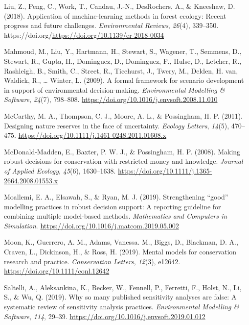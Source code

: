\documentclass[
]{article}
\newlength{\cslhangindent}
\newenvironment{CSLReferences}[2] %
 {\begin{list}{}{%
  \setlength{\itemindent}{0pt}
  \setlength{\leftmargin}{0pt}
  \setlength{\parsep}{0pt}
  \ifodd #1
   \setlength{\leftmargin}{\cslhangindent}
   \setlength{\itemindent}{-1\cslhangindent}
  \fi
  \setlength{\itemsep}{#2\baselineskip}}}
 {\end{list}}
\begin{document}
\begin{CSLReferences}{1}{0}
Liu, Z., Peng, C., Work, T., Candau, J.-N., DesRochers, A., \& Kneeshaw,
D. (2018). Application of machine-learning methods in forest ecology:
Recent progress and future challenges. \emph{Environmental Reviews},
\emph{26}(4), 339--350.
https://doi.org/\url{https://doi.org/10.1139/er-2018-0034}

Mahmoud, M., Liu, Y., Hartmann, H., Stewart, S., Wagener, T., Semmens,
D., Stewart, R., Gupta, H., Dominguez, D., Dominguez, F., Hulse, D.,
Letcher, R., Rashleigh, B., Smith, C., Street, R., Ticehurst, J., Twery,
M., Delden, H. van, Waldick, R., \ldots{} Winter, L. (2009). A formal
framework for scenario development in support of environmental
decision-making. \emph{Environmental Modelling \& Software},
\emph{24}(7), 798--808.
\url{https://doi.org/10.1016/j.envsoft.2008.11.010}

McCarthy, M. A., Thompson, C. J., Moore, A. L., \& Possingham, H. P.
(2011). Designing nature reserves in the face of uncertainty.
\emph{Ecology Letters}, \emph{14}(5), 470--475.
\url{https://doi.org/10.1111/j.1461-0248.2011.01608.x}

McDonald-Madden, E., Baxter, P. W. J., \& Possingham, H. P. (2008).
Making robust decisions for conservation with restricted money and
knowledge. \emph{Journal of Applied Ecology}, \emph{45}(6), 1630--1638.
\url{https://doi.org/10.1111/j.1365-2664.2008.01553.x}

Moallemi, E. A., Elsawah, S., \& Ryan, M. J. (2019). Strengthening
{``good''} modelling practices in robust decision support: A reporting
guideline for combining multiple model-based methods. \emph{Mathematics
and Computers in Simulation}.
\url{https://doi.org/10.1016/j.matcom.2019.05.002}

Moon, K., Guerrero, A. M., Adams, Vanessa. M., Biggs, D., Blackman, D.
A., Craven, L., Dickinson, H., \& Ross, H. (2019). Mental models for
conservation research and practice. \emph{Conservation Letters},
\emph{12}(3), e12642. \url{https://doi.org/10.1111/conl.12642}

Saltelli, A., Aleksankina, K., Becker, W., Fennell, P., Ferretti, F.,
Holst, N., Li, S., \& Wu, Q. (2019). Why so many published sensitivity
analyses are false: A systematic review of sensitivity analysis
practices. \emph{Environmental Modelling \& Software}, \emph{114},
29--39. \url{https://doi.org/10.1016/j.envsoft.2019.01.012}


\end{CSLReferences}
\end{document}
